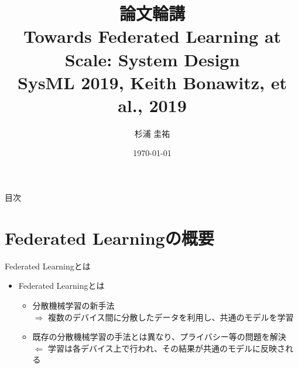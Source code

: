 \documentclass[dvipdfmx,notheorems,t]{beamer}
\title[論文輪講: Federated Learning]{論文輪講 \\ Towards Federated Learning at Scale: System Design \\ \normalsize{SysML 2019, Keith Bonawitz, et al., 2019} }
\author{杉浦 圭祐}
\institute[松谷研究室]{慶應義塾大学理工学部情報工学科 松谷研究室}
\date{\today}
\begin{document}
\frame{\titlepage}

\section{}

\begin{frame}{目次}
\tableofcontents
\end{frame}

\section{Federated Learningの概要}

\begin{frame}{Federated Learningとは}

\begin{itemize}
	\item Federated Learningとは
	\begin{itemize}
		\item \alert{分散機械学習}の新手法 \\
		$\Rightarrow$ 複数のデバイス間に分散したデータを利用し、共通のモデルを学習
		\newline
		\item 既存の分散機械学習の手法とは異なり、プライバシー等の問題を解決 \\
		$\Leftarrow$ 学習は各デバイス上で行われ、その結果が共通のモデルに反映される
	\end{itemize}
\end{itemize}

\end{frame}
\end{document}
